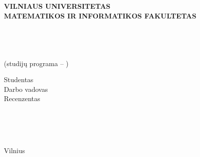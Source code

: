 \begin{titlepage}

\begin{center}



\MakeUppercase{\normalsize \textbf{Vilniaus universitetas}}\\
\MakeUppercase{\normalsize \textbf{Matematikos ir informatikos fakultetas}}\\
\MakeUppercase{\normalsize \textbf{\katedra}}\\[180pt]


\MakeUppercase{{ \normalsize \pavadinimas}}\\[24pt]
\MakeUppercase{{ \normalsize \engpavadinimas}}\\[24pt]

\normalsize \darbas \\ [24pt]
(studij\k{u} programa -- \MakeUppercase{\normalsize \studprog)}\\ [130pt]

\linespread{1.3}
\begin{minipage}{0.7\textwidth}
\begin{flushleft} \normalsize

Studentas \\  %
Darbo vadovas \\ %
Recenzentas\\ %
\end{flushleft}
\end{minipage}
\begin{minipage}{0.29\textwidth}
\begin{flushleft} \normalsize
\studentas \\
\vadovas \\
\recenzentas \\
\end{flushleft}
\end{minipage}

\vfill

{\normalsize Vilnius \the\year}

\end{center}

\end{titlepage} 